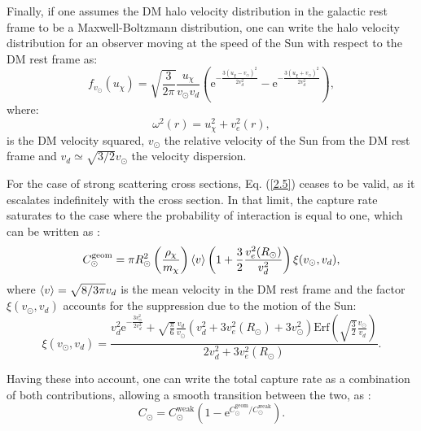 Finally, if one assumes the DM halo velocity distribution in the galactic rest frame to be a Maxwell-Boltzmann distribution, one can write the halo velocity distribution for an observer moving at the speed of the Sun with respect to the DM rest frame as:
\begin{equation}\label{2.12}
	f_{v_{\odot}}(u_{\chi}) = \sqrt{\frac{3}{2\pi}} \frac{u_{\chi}}{v_{\odot} v_{d}} \left(\mathrm{e}^{-\frac{3(u_{\chi}-v_{\odot})^{2}}{2v_{d}^{2}}}-\mathrm{e}^{-\frac{3(u_{\chi}+v_{\odot})^{2}}{2v_{d}^{2}}}\right),
\end{equation}
where:
\begin{equation}\label{2.13}
	\omega^{2}(r) = u_{\chi}^{2} + v_{e}^{2}(r),
\end{equation}
is the DM velocity squared, $v_{\odot}$ the relative velocity of the Sun from the DM rest frame and $v_{d} \simeq \sqrt{3/2} v_{\odot}$ the velocity dispersion.

For the case of strong scattering cross sections, Eq. (\ref{2.5}) ceases to be valid, as it escalates indefinitely with the cross section. In that limit, the capture rate saturates to the case where the probability of interaction is equal to one, which can be written as \cite{Gould1987a}:
\begin{equation}\label{2.14}
	C_{\odot}^{\mathrm{geom}} = \pi R_{\odot}^{2} \left(\frac{\rho_{\chi}}{m_{\chi}}\right) \expval{v} \left(1+\frac{3}{2}\frac{v_{e}^{2}(R_{\odot})}{v_{d}^{2}}\right) \xi(v_{\odot}, v_{d}),
\end{equation}
where $\expval{v} = \sqrt{8/3\pi} v_{d}$ is the mean velocity in the DM rest frame and the factor $\xi(v_{\odot}, v_{d})$ accounts for the suppression due to the motion of the Sun:
\begin{equation}\label{2.15}
	\xi(v_{\odot}, v_{d}) = \frac{v_{d}^{2}\mathrm{e}^{-\frac{3v_{\odot}^{2}}{2v_{d}^{2}}}+\sqrt{\frac{\pi}{6}}\frac{v_{d}}{v_{\odot}}\left(v_{d}^{2}+3v_{e}^{2}(R_{\odot})+3v_{\odot}^{2}\right)\mathrm{Erf}\left(\sqrt{\frac{3}{2}}\frac{v_{\odot}}{v_{d}}\right)}{2v_{d}^{2}+3v_{e}^{2}(R_{\odot})}.
\end{equation}

Having these into account, one can write the total capture rate as a combination of both contributions, allowing a smooth transition between the two, as \cite{Bernal2012}:
\begin{equation}\label{2.16}
	C_{\odot} = C_{\odot}^{\mathrm{weak}} \left(1-\mathrm{e}^{C_{\odot}^{\mathrm{geom}}/C_{\odot}^{\mathrm{weak}}}\right).
\end{equation}

